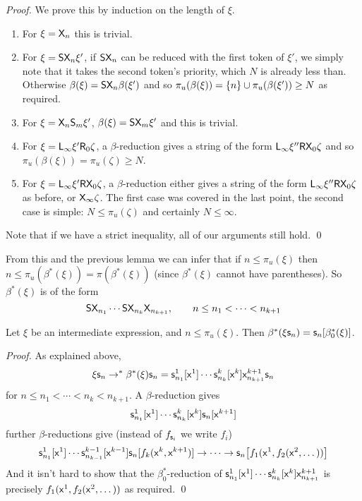 \documentclass{llncs}
\begin{document}
\begin{proof}

    We prove this by induction on the length of $\xi$.
    \begin{enumerate}
        \item For $\xi=\mathsf{X}_n$ this is trivial.
        \item For $\xi=\mathsf{S}\mathsf{X}_n\xi'$, if $\mathsf{S}\mathsf{X}_n$ can be reduced with the first token of $\xi'$, we simply note that it takes the second token's priority, which $N$ is already less than.
        Otherwise $\beta(\xi)=\mathsf{S}\mathsf{X}_n\beta(\xi')$ and so $\pi_u(\beta(\xi))=\set n\cup\pi_u(\beta(\xi'))\geq N$ as required.
        \item For $\xi=\mathsf{X}_n\mathsf{S}_m\xi'$, $\beta(\xi)=\mathsf{S}\mathsf{X}_m\xi'$ and this is trivial.
        \item For $\xi=\mathsf{L}_\infty\xi'\mathsf{R}_0\zeta$, a $\beta$-reduction gives a string of the form $\mathsf{L}_\infty\xi''\mathsf{R}\mathsf{X}_0\zeta$ and so $\pi_u(\beta(\xi))=\pi_u(\zeta)\geq N$.
        \item For $\xi=\mathsf{L}_\infty\xi'\mathsf{R}\mathsf{X}_0\zeta$, a $\beta$-reduction either gives a string of the form $\mathsf{L}_\infty\xi''\mathsf{R}\mathsf{X}_0\zeta$ as before, or $\mathsf{X}_\infty\zeta$.
        The first case was covered in the last point, the second case is simple: $N\leq\pi_u(\zeta)$ and certainly $N\leq\infty$.
    \end{enumerate}
    Note that if we have a strict inequality, all of our arguments still hold.
    \qed

\end{proof}

From this and the previous lemma we can infer that if $n\leq\pi_u(\xi)$ then $n\leq\pi_u(\beta^*(\xi))=\pi(\beta^*(\xi))$ (since $\beta^*(\xi)$ cannot have parentheses).
So $\beta^*(\xi)$ is of the form
\[ \mathsf{S}\mathsf{X}_{n_1}\cdots\mathsf{S}\mathsf{X}_{n_k}\mathsf{X}_{n_{k+1}},\qquad n\leq n_1<\cdots<n_{k+1} \]

\begin{lemma}

    Let $\xi$ be an intermediate expression, and $n\leq\pi_u(\xi)$.
    Then $\beta^*(\xi\mathsf{s}_n)=\mathsf{s}_n[\beta^*_0(\xi)]$.

\end{lemma}

\begin{proof}

    As explained above,
    \[ \xi\mathsf{s}_n \to^* \beta^*(\xi)\mathsf{s}_n = \mathsf{s}^1_{n_1}[\mathsf{x}^1]\cdots\mathsf{s}^k_{n_k}[\mathsf{x}^k]\mathsf{x}^{k+1}_{n_{k+1}}\mathsf{s}_n \]
    for $n\leq n_1<\cdots<n_k<n_{k+1}$.
    A $\beta$-reduction gives
    \[ \mathsf{s}^1_{n_1}[\mathsf{x}^1]\cdots\mathsf{s}^k_{n_k}[\mathsf{x}^k]\mathsf{s}_n[\mathsf{x}^{k+1}] \]
    further $\beta$-reductions give (instead of $f_{\mathsf{s}_i}$ we write $f_i$)
    \[ \mathsf{s}^1_{n_1}[\mathsf{x}^1]\cdots\mathsf{s}^{k-1}_{n_{k-1}}[\mathsf{x}^{k-1}]\mathsf{s}_n[f_k(\mathsf{x}^k,\mathsf{x}^{k+1})] \to \cdots \to \mathsf{s}_n\bigl[f_1(\mathsf{x}^1,f_2(\mathsf{x}^2,\dots))\bigr] \]
    And it isn't hard to show that the $\beta^*_0$-reduction of $\mathsf{s}^1_{n_1}[\mathsf{x}^1]\cdots\mathsf{s}^k_{n_k}[\mathsf{x}^k]\mathsf{x}^{k+1}_{n_{k+1}}$ is precisely $f_1(\mathsf{x}^1,f_2(\mathsf{x}^2,\dots))$ as required.
    \qed

\end{proof}
\end{document}

